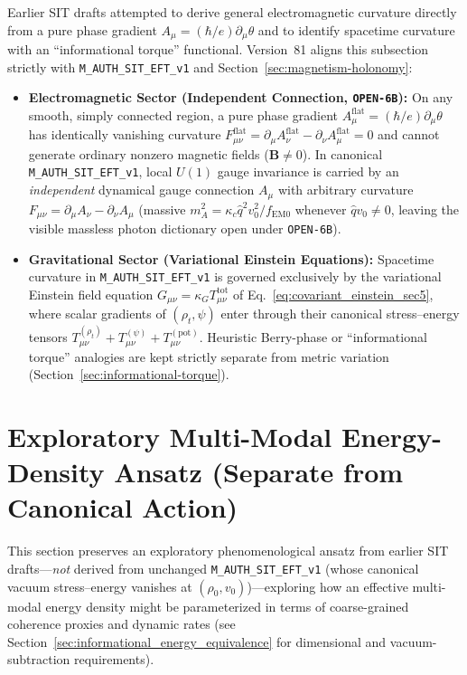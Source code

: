 Earlier SIT drafts attempted to derive general electromagnetic curvature directly from a pure phase gradient $A_\mu = (\hbar/e)\partial_\mu\theta$ and to identify spacetime curvature with an ``informational torque'' functional. Version~81 aligns this subsection strictly with \texttt{M\_AUTH\_SIT\_EFT\_v1} and Section~\ref{sec:magnetism-holonomy}:
\begin{itemize}
  \item \textbf{Electromagnetic Sector (Independent Connection, \texttt{OPEN-6B}):} On any smooth, simply connected region, a pure phase gradient $A_\mu^{\mathrm{flat}} = (\hbar/e)\partial_\mu\theta$ has identically vanishing curvature $F_{\mu\nu}^{\mathrm{flat}} = \partial_\mu A_\nu^{\mathrm{flat}} - \partial_\nu A_\mu^{\mathrm{flat}} = 0$ and cannot generate ordinary nonzero magnetic fields ($\mathbf{B} \ne 0$). In canonical \texttt{M\_AUTH\_SIT\_EFT\_v1}, local $U(1)$ gauge invariance is carried by an \emph{independent} dynamical gauge connection $A_\mu$ with arbitrary curvature $F_{\mu\nu} = \partial_\mu A_\nu - \partial_\nu A_\mu$ (massive $m_A^2 = \kappa_c\hat{q}^2 v_0^2/f_{\mathrm{EM}0}$ whenever $\hat{q}v_0 \ne 0$, leaving the visible massless photon dictionary open under \texttt{OPEN-6B}).
  \item \textbf{Gravitational Sector (Variational Einstein Equations):} Spacetime curvature in \texttt{M\_AUTH\_SIT\_EFT\_v1} is governed exclusively by the variational Einstein field equation $G_{\mu\nu} = \kappa_G T_{\mu\nu}^{\mathrm{tot}}$ of Eq.~\eqref{eq:covariant_einstein_sec5}, where scalar gradients of $(\rho_t, \psi)$ enter through their canonical stress--energy tensors $T_{\mu\nu}^{(\rho_t)} + T_{\mu\nu}^{(\psi)} + T_{\mu\nu}^{(\mathrm{pot})}$. Heuristic Berry-phase or ``informational torque'' analogies are kept strictly separate from metric variation (Section~\ref{sec:informational-torque}).
\end{itemize}

\section{Exploratory Multi-Modal Energy-Density Ansatz (Separate from Canonical Action)}
\label{sec:integrated_functional}

This section preserves an exploratory phenomenological ansatz from earlier SIT drafts---\emph{not} derived from unchanged \texttt{M\_AUTH\_SIT\_EFT\_v1} (whose canonical vacuum stress--energy vanishes at $(\rho_0, v_0)$)---exploring how an effective multi-modal energy density might be parameterized in terms of coarse-grained coherence proxies and dynamic rates (see Section~\ref{sec:informational_energy_equivalence} for dimensional and vacuum-subtraction requirements).

